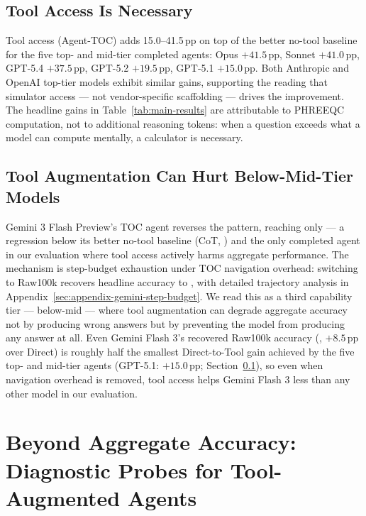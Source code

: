 \documentclass{article}
\begin{document}
\subsection{Tool Access Is Necessary}
\label{sec:main-tool}

Tool access (Agent-TOC) adds 15.0--41.5\,pp on top of the better no-tool baseline for the five top- and mid-tier completed agents: Opus $+41.5$\,pp, Sonnet $+41.0$\,pp, GPT-5.4 $+37.5$\,pp, GPT-5.2 $+19.5$\,pp, GPT-5.1 $+15.0$\,pp. Both Anthropic and OpenAI top-tier models exhibit similar gains, supporting the reading that simulator access --- not vendor-specific scaffolding --- drives the improvement. The headline gains in Table~\ref{tab:main-results} are attributable to PHREEQC computation, not to additional reasoning tokens: when a question exceeds what a model can compute mentally, a calculator is necessary.

\subsection{Tool Augmentation Can Hurt Below-Mid-Tier Models}
\label{sec:main-belowmid}

Gemini 3 Flash Preview's TOC agent reverses the pattern, reaching only \GeminiThreeFlashTOC{} --- a \GeminiThreeFlashTOCMinusBestNoTool{} regression below its better no-tool baseline (CoT, \GeminiThreeFlashCoT{}) and the only completed agent in our evaluation where tool access actively harms aggregate performance. The mechanism is step-budget exhaustion under TOC navigation overhead: switching to Raw100k recovers headline accuracy to \GeminiThreeFlashRaw{}, with detailed trajectory analysis in Appendix~\ref{sec:appendix-gemini-step-budget}. We read this as a third capability tier --- below-mid --- where tool augmentation can degrade aggregate accuracy not by producing wrong answers but by preventing the model from producing any answer at all. Even Gemini Flash 3's recovered Raw100k accuracy (\GeminiThreeFlashRaw{}, $+8.5$\,pp over Direct) is roughly half the smallest Direct-to-Tool gain achieved by the five top- and mid-tier agents (GPT-5.1: $+15.0$\,pp; Section~\ref{sec:main-tool}), so even when navigation overhead is removed, tool access helps Gemini Flash 3 less than any other model in our evaluation.

\section{Beyond Aggregate Accuracy: Diagnostic Probes for Tool-Augmented Agents}
\label{sec:diagnostic}
\end{document}
